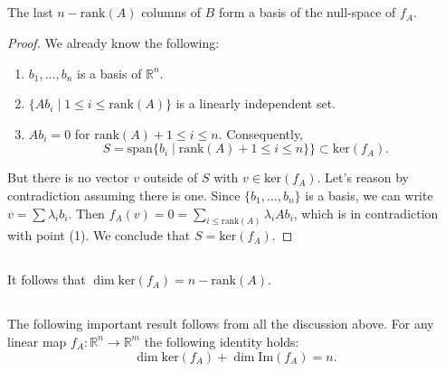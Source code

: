 \documentclass{proc-l}
\theoremstyle{definition}
\theoremstyle{remark}
\numberwithin{equation}{section}
\newcommand{\R}{\mathbb{R}}
\newcommand{\rank}[1]{\textrm{rank}({#1})}
\newcommand{\im}[1]{\textrm{Im}({#1})}
\renewcommand{\ker}[1]{\textrm{ker}({#1})}
\renewcommand{\span}[1]{\textrm{span}\{ {#1} \}}
\begin{document}
\subsection{}
The last $n - \rank{A}$ columns of $B$ form a basis of the null-space of $f_A$. 
\begin{proof}
We already know the following:
\begin{enumerate}
\item $b_1, \ldots, b_n$ is a basis of $\R^n$.
\item $\{Ab_i\;|\; 1\leq i\leq \rank{A}\}$ is a linearly independent set.
\item $Ab_i = 0$ for $\rank{A} + 1\leq i\leq n$. Consequently, 
\[
S=\span{b_i\;|\; \rank{A} + 1\leq i \leq n} \} \subset \ker{f_A}.
\]
\end{enumerate}
But there is no vector $v$ outside of $S$ with $v\in\ker{f_A}$. Let's reason by contradiction assuming there is one. Since $\{b_1,\ldots, b_n\}$ is a basis, we can write $v=\sum\lambda_i b_i$. Then $f_A (v) = 0 = \sum_{i\leq\rank{A}} \lambda_i Ab_i$, which is in contradiction with point (1). We conclude that $S=\ker{f_A}$.
\end{proof}

\subsection{}
It follows that $\dim{\ker{f_A}} = n - \rank{A}$.


\subsection{}
The following important result follows from all the discussion above. For any linear map $f_A:\R^n\to\R^m$ the following identity holds:
\[
\dim{\ker{f_A}} + \dim{\im{f_A}} = n.
\]



\end{document}
